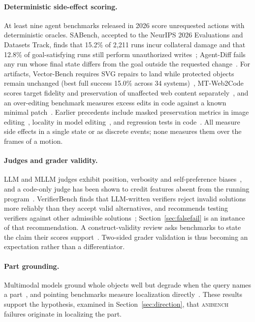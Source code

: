 \documentclass[11pt]{article}
\newcommand{\anibench}{\textsc{anibench}}
\begin{document}
\paragraph{Deterministic side-effect scoring.} At least nine agent benchmarks released in 2026 score unrequested actions with deterministic oracles. SABench, accepted to the NeurIPS 2026 Evaluations and Datasets Track, finds that 15.2\% of 2{,}211 runs incur collateral damage and that 12.8\% of goal-satisfying runs still perform unauthorized writes~\citep{huang2026sabench}; Agent-Diff fails any run whose final state differs from the goal outside the requested change~\citep{pysklo2026agentdiff}. For artifacts, Vector-Bench requires SVG repairs to land while protected objects remain unchanged (best full success 15.0\% across 34 systems)~\citep{gupta2026vectorbench}, MT-Web2Code scores target fidelity and preservation of unaffected web content separately~\citep{li2026mtweb2code}, and an over-editing benchmark measures excess edits in code against a known minimal patch~\citep{zhu2026overediting}. Earlier precedents include masked preservation metrics in image editing~\citep{ju2024directinversion,ma2024i2ebench}, locality in model editing~\citep{meng2022rome,meng2023memit,cohen2024rippleedits}, and regression tests in code~\citep{jimenez2024swebench,cassano2024canitedit}. All measure side effects in a single state or as discrete events; none measures them over the frames of a motion.

\paragraph{Judges and grader validity.} LLM and MLLM judges exhibit position, verbosity and self-preference biases~\citep{zheng2023judging,chen2024mllmjudge,ye2025justice}, and a code-only judge has been shown to credit features absent from the running program~\citep{bakshi2026worldbench}. VerifierBench finds that LLM-written verifiers reject invalid solutions more reliably than they accept valid alternatives, and recommends testing verifiers against other admissible solutions~\citep{yin2026verifierbench}; Section~\ref{sec:falsefail} is an instance of that recommendation. A construct-validity review asks benchmarks to state the claim their scores support~\citep{bean2025constructvalidity}. Two-sided grader validation is thus becoming an expectation rather than a differentiator.

\paragraph{Part grounding.} Multimodal models ground whole objects well but degrade when the query names a part~\citep{mehrab2026ophrg}, and pointing benchmarks measure localization directly~\citep{cheng2025pointarena}. These results support the hypothesis, examined in Section~\ref{sec:direction}, that \anibench{} failures originate in localizing the part.
\end{document}
